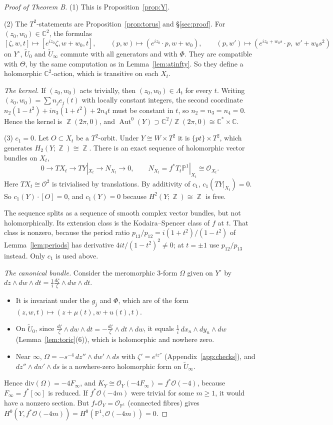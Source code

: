 \documentclass{article}
\DeclareMathOperator{\Z}{\mathbb{Z}}
\theoremstyle{definition}
\theoremstyle{plain}
\newcommand{\C}{\mathbb{C}}
\newcommand{\PP}{\mathbb{P}}
\newcommand{\cO}{\mathcal{O}}
\newcommand{\Ut}{\widetilde{U}}
\newcommand{\Yo}{Y^{\circ}}
\DeclareMathOperator{\Aut}{Aut}
\begin{document}
\begin{proof}[Proof of Theorem B]
(1) This is Proposition~\ref{prop:Y}.

(2) The $T^2$-statements are Proposition~\ref{prop:torus} and \S\ref{sec:proof}. For
$(z_0,w_0)\in\C^2$, the formulas
\[
[\zeta,w,t]\mapsto[e^{iz_0}\zeta,w+w_0,t],\qquad (p,w)\mapsto(e^{iz_0}\cdot p,w+w_0),\qquad
(p,w')\mapsto(e^{iz_0+w_0s}\cdot p,\ w'+w_0s^2)
\]
on $\Yo$, $\Ut_0$ and $\Ut_\infty$ commute with all generators and with $\Phi$. They are
compatible with $\Theta$, by the same computation as in Lemma~\ref{lem:atinfty}. So
they define a holomorphic $\C^2$-action, which is transitive on each $X_t$.

\emph{The kernel.} If $(z_0,w_0)$ acts trivially, then $(z_0,w_0)\in\Lambda_t$ for every $t$.
Writing $(z_0,w_0)=\sum n_je_j(t)$ with locally constant integers, the second
coordinate $n_2(1-t^2)+in_3(1+t^2)+2n_4t$ must be constant in $t$, so
$n_2=n_3=n_4=0$. Hence the kernel is $\Z(2\pi,0)$, and
$\Aut^0(Y)\supset\C^2/\Z(2\pi,0)\cong\C^*\times\C$.

(3) \emph{$c_1=0$.} Let $O\subset X_t$ be a $T^2$-orbit. Under $Y\cong W\times T^2$ it is
$\{pt\}\times T^2$, which generates $H_2(Y;\Z)\cong\Z$. There is an exact sequence of
holomorphic vector bundles on $X_t$,
\[0\to TX_t\to TY|_{X_t}\to N_{X_t}\to0,\qquad N_{X_t}=f^*T_t\PP^1|_{X_t}\cong\cO_{X_t}.\]
Here $TX_t\cong\cO^2$ is trivialised by translations. By additivity of $c_1$,
$c_1(TY|_{X_t})=0$. So $c_1(Y)\cdot[O]=0$, and $c_1(Y)=0$ because
$H^2(Y;\Z)\cong\Z$ is free.

The sequence splits as a sequence of smooth complex vector bundles, but not
holomorphically. Its extension class is the Kodaira--Spencer class of $f$ at $t$. That
class is nonzero, because the period ratio $p_{13}/p_{12}=i(1+t^2)/(1-t^2)$ of
Lemma~\ref{lem:periods} has derivative $4it/(1-t^2)^2\ne0$; at $t=\pm1$ use
$p_{12}/p_{13}$ instead. Only $c_1$ is used above.

\emph{The canonical bundle.} Consider the meromorphic $3$-form $\Omega$ given on $\Yo$ by
$dz\wedge dw\wedge dt=\tfrac1{i}\tfrac{d\zeta}{\zeta}\wedge dw\wedge dt$.
\begin{itemize}
\item It is invariant under the $g_j$ and $\Phi$, which are of the form
  $(z,w,t)\mapsto(z+\mu(t),w+u(t),t)$.
\item On $\Ut_0$, since $\tfrac{d\zeta}{\zeta}\wedge dw\wedge dt=-\tfrac{d\zeta}{\zeta}\wedge dt\wedge dw$,
  it equals $\tfrac{1}{i}\,dx_n\wedge dy_n\wedge dw$ (Lemma~\ref{lem:toric}(6)), which is
  holomorphic and nowhere zero.
\item Near $\infty$, $\Omega=-s^{-4}\,dz''\wedge dw'\wedge ds$ with $\zeta'=e^{iz''}$
  (Appendix~\ref{app:checks}), and $dz''\wedge dw'\wedge ds$ is a nowhere-zero
  holomorphic form on $\Ut_\infty$.
\end{itemize}
Hence $\mathrm{div}(\Omega)=-4F_\infty$, and $K_Y\cong\cO_Y(-4F_\infty)=f^*\cO(-4)$, because
$F_\infty=f^*[\infty]$ is reduced. If $f^*\cO(-4m)$ were trivial for some $m\ge1$, it
would have a nonzero section. But $f_*\cO_Y=\cO_{\PP^1}$ (connected fibres) gives
$H^0(Y,f^*\cO(-4m))=H^0(\PP^1,\cO(-4m))=0$.


\end{proof}
\end{document}
